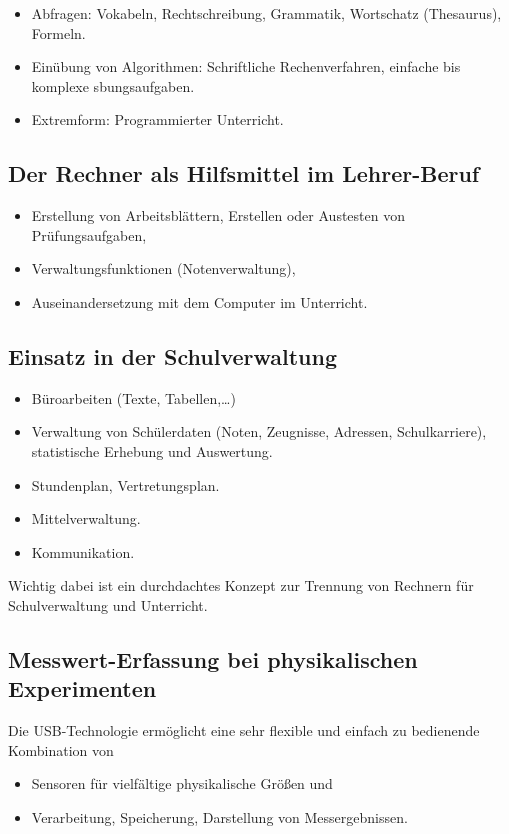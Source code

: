 \begin{itemize}
\item
Abfragen: Vokabeln, Rechtschreibung, Grammatik,
Wortschatz (Thesaurus), Formeln.
\item
Ein\"{u}bung von Algorithmen: Schriftliche Rechenverfahren, einfache
bis komplexe sbungsaufgaben.
\item
Extremform: Programmierter Unterricht.
\end{itemize}


\subsection{Der Rechner als Hilfsmittel im Lehrer-Beruf}

\begin{itemize}
\item
Erstellung von Arbeitsbl\"{a}ttern, Erstellen oder Austesten von
Pr\"{u}fungsaufgaben,
\item
Verwaltungsfunktionen (Notenverwaltung),
\item
Auseinandersetzung mit dem Computer im Unterricht.
\end{itemize}

\subsection{Einsatz in der Schulverwaltung}

\begin{itemize}
\item
B\"{u}roarbeiten (Texte, Tabellen,\dots)
\item
Verwaltung von Sch\"{u}lerdaten (Noten, Zeugnisse, Adressen,
Schulkarriere), statistische Erhebung und Auswertung.
\item
Stundenplan, Vertretungsplan.
\item
Mittelverwaltung.
\item
Kommunikation.
\end{itemize}

Wichtig dabei ist ein durchdachtes Konzept zur Trennung von Rechnern f\"{u}r Schulverwaltung und
Unterricht.

\subsection{Messwert-Erfassung bei physikalischen Experimenten}

Die USB-Technologie erm\"{o}glicht eine sehr flexible und einfach zu bedienende Kombination von
\begin{itemize}
\item Sensoren f\"{u}r vielf\"{a}ltige physikalische Gr\"{o}{\ss}en \q und
\item Verarbeitung, Speicherung, Darstellung von Messergebnissen.
\end{itemize}

